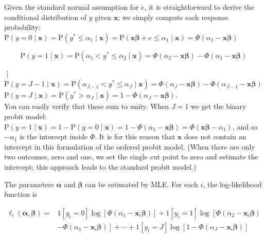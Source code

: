 \documentclass[10pt]{article}
\begin{document}
Given the standard normal assumption for $e$, it is straightforward to derive the conditional distribution of $y$ given $\mathbf{x}$; we simply compute each response probability:\\
$\mathrm{P}(y=0 \mid \mathbf{x})=\mathrm{P}\left(y^{*} \leq \alpha_{1} \mid \mathbf{x}\right)=\mathrm{P}\left(\mathbf{x} \boldsymbol{\beta}+e \leq \alpha_{1} \mid \mathbf{x}\right)=\Phi\left(\alpha_{1}-\mathbf{x} \boldsymbol{\beta}\right)$


\begin{equation*}
\mathrm{P}(y=1 \mid \mathbf{x})=\mathrm{P}\left(\alpha_{1}<y^{*} \leq \alpha_{2} \mid \mathbf{x}\right)=\Phi\left(\alpha_{2}-\mathbf{x} \boldsymbol{\beta}\right)-\Phi\left(\alpha_{1}-\mathbf{x} \boldsymbol{\beta}\right) \tag{16.23}
\end{equation*}


⋮\\
$\mathrm{P}(y=J-1 \mid \mathbf{x})=\mathrm{P}\left(\alpha_{J-1}<y^{*} \leq \alpha_{J} \mid \mathbf{x}\right)=\Phi\left(\alpha_{J}-\mathbf{x} \boldsymbol{\beta}\right)-\Phi\left(\alpha_{J-1}-\mathbf{x} \boldsymbol{\beta}\right)$\\
$\mathrm{P}(y=J \mid \mathbf{x})=\mathrm{P}\left(y^{*}>\alpha_{J} \mid \mathbf{x}\right)=1-\Phi\left(\alpha_{J}-\mathbf{x} \boldsymbol{\beta}\right)$.\\
You can easily verify that these sum to unity. When $J=1$ we get the binary probit model: $\mathrm{P}(y=1 \mid \mathbf{x})=1-\mathrm{P}(y=0 \mid \mathbf{x})=1-\Phi\left(\alpha_{1}-\mathbf{x} \boldsymbol{\beta}\right)=\Phi\left(\mathbf{x} \boldsymbol{\beta}-\alpha_{1}\right)$, and so $-\alpha_{1}$ is the intercept inside $\Phi$. It is for this reason that $\mathbf{x}$ does not contain an intercept in this formulation of the ordered probit model. (When there are only two outcomes, zero and one, we set the single cut point to zero and estimate the intercept; this approach leads to the standard probit model.)

The parameters $\boldsymbol{\alpha}$ and $\boldsymbol{\beta}$ can be estimated by MLE. For each $i$, the log-likelihood function is


\begin{align*}
\ell_{i}(\boldsymbol{\alpha}, \boldsymbol{\beta})= & 1\left[y_{i}=0\right] \log \left[\Phi\left(\alpha_{1}-\mathbf{x}_{i} \boldsymbol{\beta}\right)\right]+1\left[y_{i}=1\right] \log \left[\Phi\left(\alpha_{2}-\mathbf{x}_{i} \boldsymbol{\beta}\right)\right. \\
& \left.-\Phi\left(\alpha_{1}-\mathbf{x}_{i} \boldsymbol{\beta}\right)\right]+\cdots+1\left[y_{i}=J\right] \log \left[1-\Phi\left(\alpha_{J}-\mathbf{x}_{i} \boldsymbol{\beta}\right)\right] \tag{16.24}
\end{align*}
\end{document}
